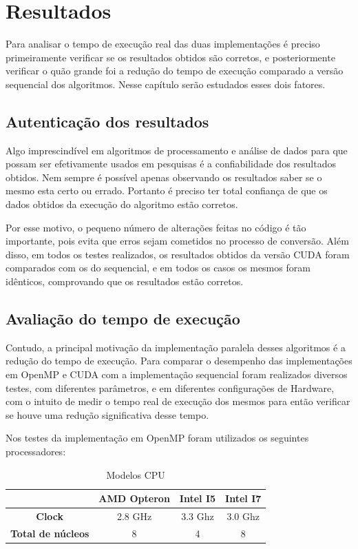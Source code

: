 \chapter{Resultados}

Para analisar o tempo de execução real das duas implementações é preciso primeiramente verificar se os resultados obtidos são corretos, e posteriormente verificar o quão grande foi a redução do tempo de execução comparado a versão sequencial dos algoritmos. Nesse capítulo serão estudados esses dois fatores.

\section{Autenticação dos resultados}

Algo imprescindível em algoritmos de processamento e análise de dados para que possam ser efetivamente usados em pesquisas é a confiabilidade dos resultados obtidos. Nem sempre é possível apenas observando os resultados saber se o mesmo esta certo ou errado. Portanto é preciso ter total confiança de que os dados obtidos da execução do algoritmo estão corretos.

Por esse motivo, o pequeno número de alterações feitas no código é tão importante, pois evita que erros sejam cometidos no processo de conversão. Além disso, em todos os testes realizados, os resultados obtidos da versão CUDA foram comparados com os do sequencial, e em todos os casos os mesmos foram idênticos, comprovando que os resultados estão corretos.

\section{Avaliação do tempo de execução}

Contudo, a principal motivação da implementação paralela desses algoritmos é a redução do tempo de execução. Para comparar o desempenho das implementações em OpenMP e CUDA com a implementação sequencial foram realizados diversos testes, com diferentes parâmetros, e em diferentes configurações de Hardware, com o intuito de medir o tempo real de execução dos mesmos para então verificar se houve uma redução significativa desse tempo.

Nos testes da implementação em OpenMP foram utilizados os seguintes processadores:

\begin{table}[H]
\caption{Modelos CPU}
\begin{center}
\begin{tabular}{cccc}
 & \textbf{AMD Opteron} & \textbf{Intel I5} & \textbf{Intel I7} \\
\hline\hline
\textbf{Clock}				& 2.8 GHz	& 3.3 Ghz	& 3.0 Ghz \\
\textbf{Total de núcleos}	& 8			& 4			& 8
\end{tabular} 
\end{center}
\end{table}

